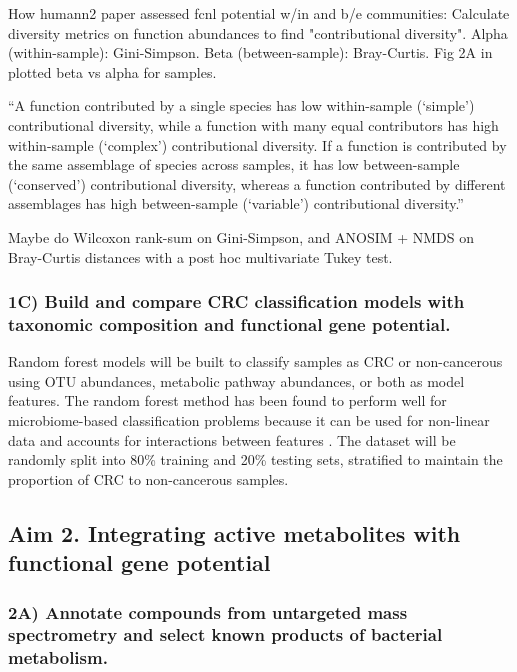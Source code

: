 \documentclass[11pt]{article}
\begin{document}
How humann2 paper assessed fcnl potential w/in and b/e communities:
Calculate diversity metrics on function abundances to find "contributional diversity".
Alpha (within-sample): Gini-Simpson. Beta (between-sample): Bray-Curtis.
Fig 2A in \cite{franzosa_species-level_2018} plotted beta vs alpha for samples.

``A function contributed by a single species has low within-sample (‘simple’) contributional diversity, while a function with many equal contributors has high within-sample (‘complex’) contributional diversity. If a function is contributed by the same assemblage of species across samples, it has low between-sample (‘conserved’) contributional diversity, whereas a function contributed by different assemblages has high between-sample (‘variable’) contributional diversity.'' \cite{franzosa_species-level_2018}


Maybe do Wilcoxon rank-sum on Gini-Simpson, and ANOSIM + NMDS on Bray-Curtis distances with a post hoc multivariate Tukey test. \cite{hannigan_diagnostic_2018}

\subsubsection*{1C) Build and compare CRC classification models with taxonomic composition and functional gene potential.}

Random forest models will be built to classify samples as CRC or non-cancerous using OTU abundances, metabolic pathway abundances, or both as model features.
The random forest method has been found to perform well for microbiome-based classification problems because it can be used for non-linear data and accounts for interactions between features \cite{baxter_microbiota-based_2016}.
The dataset will be randomly split into 80\% training and 20\% testing sets, stratified to maintain the proportion of CRC to non-cancerous samples.

\subsection*{Aim 2. Integrating active metabolites with functional gene potential}

\subsubsection*{2A) Annotate compounds from untargeted mass spectrometry and select known products of bacterial metabolism.}
\end{document}
